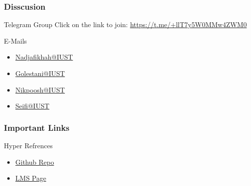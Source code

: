 \documentclass{beamer}
\begin{document}
\begin{frame}
  \frametitle{Disscusion}
\begin{block}{Telegram Group}
  Click on the link to join: \hyperlink{Group Link}{https://t.me/+llT7y5W0MMw4ZWM0}
\end{block}
  
\begin{block}{E-Mails}
  \begin{itemize}
    \item \href{mailto:m_nadjafikhah@iust.ac.ir}{Nadjafikhah@IUST}
    \item \href{mailto:golestani_ali@mathdep.iust.ac.ir}{Golestani@IUST}
    \item \href{mailto:alireza_nikpoosh@mathdep.iust.ac.ir}{Nikpoosh@IUST}
    \item \href{mailto:nargess_seifi@mathdep.iust.ac.ir}{Seifi@IUST}
  \end{itemize}
\end{block}
\end{frame}

\begin{frame}
  \frametitle{Important Links}
\begin{alertblock}{Hyper Refrences}
  \begin{itemize}
    \item \href{https://github.com/golestani-ali/LinAlg-4001-2}{Github Repo}
    \item \href{URL}{LMS Page}
  \end{itemize}
\end{alertblock}
\end{frame}
\end{document}
